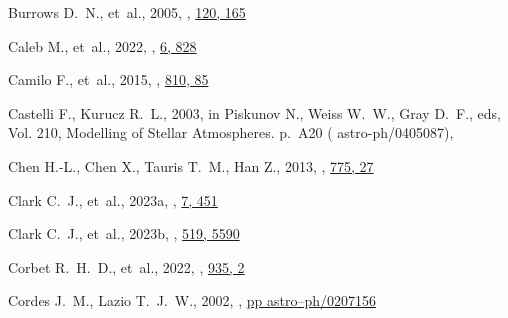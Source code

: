 \documentclass[fleqn,usenatbib]{mnras}
\begin{document}
\begin{thebibliography}{99}
{Burrows} D.~N.,  et~al., 2005, , \href {https://ui.adsabs.harvard.edu/abs/2005SSRv..120..165B} {120, 165}

{Caleb} M.,  et~al., 2022, , \href {https://ui.adsabs.harvard.edu/abs/2022NatAs...6..828C} {6, 828}

{Camilo} F.,  et~al., 2015, , \href {https://ui.adsabs.harvard.edu/abs/2015ApJ...810...85C} {810, 85}

{Castelli} F.,  {Kurucz} R.~L.,  2003, in {Piskunov} N.,  {Weiss} W.~W.,   {Gray} D.~F.,  eds,  Vol. 210, Modelling of Stellar Atmospheres. p.~A20 ( {astro-ph/0405087}), 

{Chen} H.-L.,  {Chen} X.,  {Tauris} T.~M.,   {Han} Z.,  2013, , \href {https://ui.adsabs.harvard.edu/abs/2013ApJ...775...27C} {775, 27}

{Clark} C.~J.,  et~al., 2023a, , \href {https://ui.adsabs.harvard.edu/abs/2023NatAs...7..451C} {7, 451}

{Clark} C.~J.,  et~al., 2023b, , \href {https://ui.adsabs.harvard.edu/abs/2023MNRAS.519.5590C} {519, 5590}

{Corbet} R.~H.~D.,  et~al., 2022, , \href {https://ui.adsabs.harvard.edu/abs/2022ApJ...935....2C} {935, 2}

{Cordes} J.~M.,  {Lazio} T.~J.~W.,  2002, , \href {https://ui.adsabs.harvard.edu/abs/2002astro.ph..7156C} {pp astro--ph/0207156}


\end{thebibliography}
\end{document}
